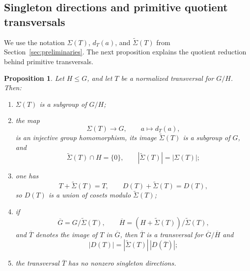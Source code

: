 \documentclass[reqno]{amsart}
\numberwithin{equation}{section}
\newtheorem{proposition}[theorem]{Proposition}
\theoremstyle{definition}
\begin{document}
\subsection{Singleton directions and primitive quotient transversals}
\label{subsec:singleton-primitive-quotient}

We use the notation $\Sigma(T)$, $d_T(a)$, and $\widetilde\Sigma(T)$ from
Section~\ref{sec:preliminaries}.  The next proposition explains the quotient
reduction behind primitive transversals.

\begin{proposition}
\label{prop:primitive-quotient-reduction}
Let $H\leq G$, and let $T$ be a normalized transversal for $G/H$.  Then:
\begin{enumerate}
  \item $\Sigma(T)$ is a subgroup of $G/H$;

  \item the map
  \[
    \Sigma(T)\longrightarrow G,
    \qquad a\longmapsto d_T(a),
  \]
  is an injective group homomorphism, its image $\widetilde\Sigma(T)$ is a
  subgroup of $G$, and
  \[
    \widetilde\Sigma(T)\cap H=\{0\},
    \qquad
    |\widetilde\Sigma(T)|=|\Sigma(T)|;
  \]

  \item one has
  \[
    T+\widetilde\Sigma(T)=T,
    \qquad
    D(T)+\widetilde\Sigma(T)=D(T),
  \]
  so $D(T)$ is a union of cosets modulo $\widetilde\Sigma(T)$;

  \item if
  \[
    \overline G=G/\widetilde\Sigma(T),
    \qquad
    \overline H=(H+\widetilde\Sigma(T))/\widetilde\Sigma(T),
  \]
  and $\overline T$ denotes the image of $T$ in $\overline G$, then
  $\overline T$ is a transversal for $\overline G/\overline H$ and
  \[
    |D(T)|=|\widetilde\Sigma(T)|\,|D(\overline T)|;
  \]

  \item the transversal $\overline T$ has no nonzero singleton directions.
\end{enumerate}
\end{proposition}
\end{document}

